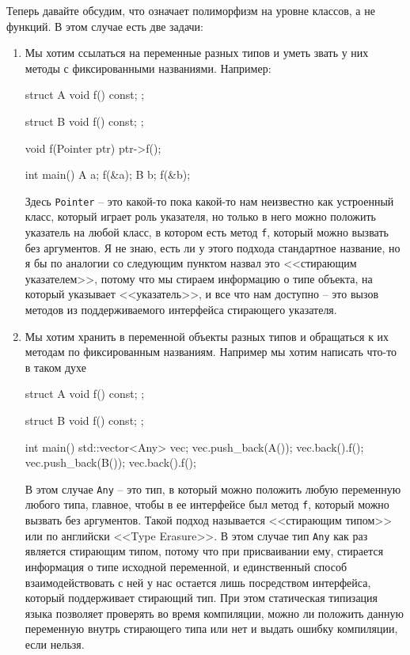 Теперь давайте обсудим, что означает полиморфизм на уровне классов, а не функций.
В этом случае есть две задачи:
\begin{enumerate}
\item Мы хотим ссылаться на переменные разных типов и уметь звать у них методы с фиксированными названиями.
Например:
\begin{cppcode}
struct A {
  void f() const;
};

struct B {
  void f() const;
};

void f(Pointer ptr) {
  ptr->f();
}

int main() {
  A a;
  f(&a);
  B b;
  f(&b);
}
\end{cppcode}
Здесь \texttt{Pointer} -- это какой-то пока какой-то нам неизвестно как устроенный класс, который играет роль указателя, но только в него можно положить указатель на любой класс, в котором есть метод \texttt{f}, который можно вызвать без аргументов.
Я не знаю, есть ли у этого подхода стандартное название, но я бы по аналогии со следующим пунктом назвал это <<стирающим указателем>>, потому что мы стираем информацию о типе объекта, на который указывает <<указатель>>, и все что нам доступно -- это вызов методов из поддерживаемого интерфейса стирающего указателя.

\item Мы хотим хранить в переменной объекты разных типов и обращаться к их методам по фиксированным названиям.
Например мы хотим написать что-то в таком духе
\begin{cppcode}
struct A {
  void f() const;
};

struct B {
  void f() const;
};

int main() {
  std::vector<Any> vec;
  vec.push_back(A());
  vec.back().f();
  vec.push_back(B());
  vec.back().f();
}
\end{cppcode}
В этом случае \texttt{Any} -- это тип, в который можно положить любую переменную любого типа, главное, чтобы в ее интерфейсе был метод \texttt{f}, который можно вызвать без аргументов.
Такой подход называется <<стирающим типом>> или по английски <<Type Erasure>>.
В этом случае тип \texttt{Any} как раз является стирающим типом, потому что при присваивании ему, стирается информация о типе исходной переменной, и единственный способ взаимодействовать с ней у нас остается лишь посредством интерфейса, который поддерживает стирающий тип.
При этом статическая типизация языка позволяет проверять во время компиляции, можно ли положить данную переменную внутрь стирающего типа или нет и выдать ошибку компиляции, если нельзя.
\end{enumerate}

